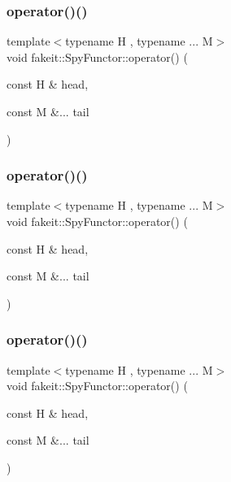 \subsubsection{\texorpdfstring{operator()()}{operator()()}\hspace{0.1cm}{\footnotesize\ttfamily [3/9]}}
{\footnotesize\ttfamily template$<$typename H , typename ... M$>$ \\
void fakeit\+::\+Spy\+Functor\+::operator() (\begin{DoxyParamCaption}\item[{const H \&}]{head,  }\item[{const M \&...}]{tail }\end{DoxyParamCaption})\hspace{0.3cm}{\ttfamily [inline]}}

\mbox{\label{classfakeit_1_1SpyFunctor_aaac87a66aafadbf0ef8859114546ff9f}} 
\subsubsection{\texorpdfstring{operator()()}{operator()()}\hspace{0.1cm}{\footnotesize\ttfamily [4/9]}}
{\footnotesize\ttfamily template$<$typename H , typename ... M$>$ \\
void fakeit\+::\+Spy\+Functor\+::operator() (\begin{DoxyParamCaption}\item[{const H \&}]{head,  }\item[{const M \&...}]{tail }\end{DoxyParamCaption})\hspace{0.3cm}{\ttfamily [inline]}}

\mbox{\label{classfakeit_1_1SpyFunctor_aaac87a66aafadbf0ef8859114546ff9f}} 
\subsubsection{\texorpdfstring{operator()()}{operator()()}\hspace{0.1cm}{\footnotesize\ttfamily [5/9]}}
{\footnotesize\ttfamily template$<$typename H , typename ... M$>$ \\
void fakeit\+::\+Spy\+Functor\+::operator() (\begin{DoxyParamCaption}\item[{const H \&}]{head,  }\item[{const M \&...}]{tail }\end{DoxyParamCaption})\hspace{0.3cm}{\ttfamily [inline]}}

